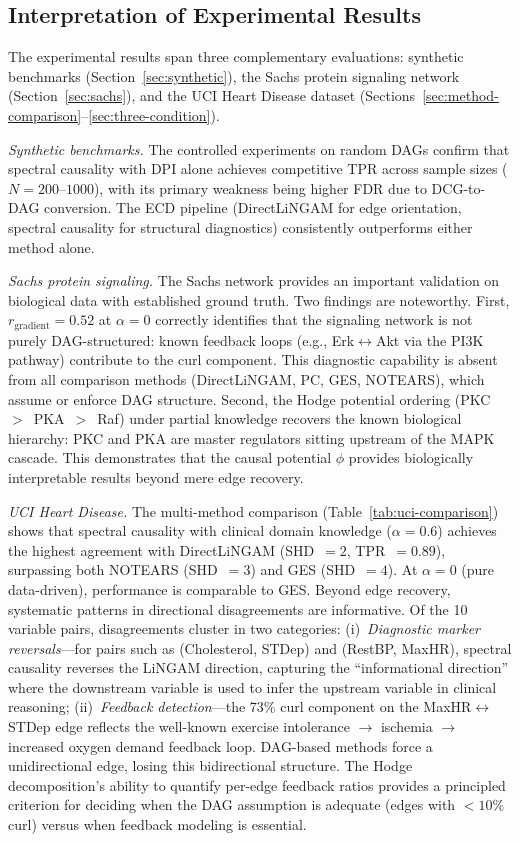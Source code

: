 \documentclass[twoside,11pt]{article}
\begin{document}
\subsection{Interpretation of Experimental Results}

The experimental results span three complementary evaluations: synthetic
benchmarks (Section~\ref{sec:synthetic}), the Sachs protein signaling
network (Section~\ref{sec:sachs}), and the UCI Heart Disease dataset
(Sections~\ref{sec:method-comparison}--\ref{sec:three-condition}).

\emph{Synthetic benchmarks.}  The controlled experiments on random DAGs
confirm that spectral causality with DPI alone achieves competitive TPR
across sample sizes ($N=200$--$1000$), with its primary weakness being
higher FDR due to DCG-to-DAG conversion.  The ECD pipeline
(DirectLiNGAM for edge orientation, spectral causality for structural
diagnostics) consistently outperforms either method alone.

\emph{Sachs protein signaling.}  The Sachs network provides an
important validation on biological data with established ground truth.
Two findings are noteworthy.
First, $r_{\mathrm{gradient}}=0.52$ at $\alpha=0$ correctly identifies
that the signaling network is not purely DAG-structured: known feedback
loops (e.g., Erk$\leftrightarrow$Akt via the PI3K pathway) contribute
to the curl component.  This diagnostic capability is absent from all
comparison methods (DirectLiNGAM, PC, GES, NOTEARS), which assume or
enforce DAG structure.
Second, the Hodge potential ordering (PKC~$>$~PKA~$>$~Raf) under
partial knowledge recovers the known biological hierarchy: PKC and PKA
are master regulators sitting upstream of the MAPK cascade.  This
demonstrates that the causal potential $\phi$ provides biologically
interpretable results beyond mere edge recovery.

\emph{UCI Heart Disease.}  The multi-method comparison
(Table~\ref{tab:uci-comparison}) shows that spectral causality with
clinical domain knowledge ($\alpha=0.6$) achieves the highest agreement
with DirectLiNGAM (SHD~$=2$, TPR~$=0.89$), surpassing both NOTEARS
(SHD~$=3$) and GES (SHD~$=4$).  At $\alpha=0$ (pure data-driven),
performance is comparable to GES.  Beyond edge recovery, systematic
patterns in directional disagreements are informative.
Of the 10 variable pairs, disagreements cluster in two categories:
(i)~\emph{Diagnostic marker reversals}---for pairs such as
(Cholesterol, STDep) and (RestBP, MaxHR), spectral causality reverses
the LiNGAM direction, capturing the ``informational direction'' where
the downstream variable is used to infer the upstream variable in
clinical reasoning; (ii)~\emph{Feedback detection}---the 73\% curl
component on the MaxHR$\leftrightarrow$STDep edge reflects the
well-known exercise intolerance $\to$ ischemia $\to$ increased oxygen
demand feedback loop.  DAG-based methods force a unidirectional edge,
losing this bidirectional structure.  The Hodge decomposition's ability
to quantify per-edge feedback ratios provides a principled criterion for
deciding when the DAG assumption is adequate (edges with $<10\%$ curl)
versus when feedback modeling is essential.
\end{document}

